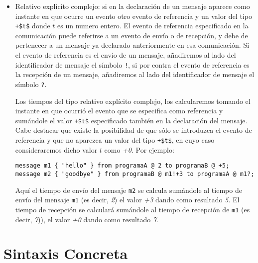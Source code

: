 \begin{itemize}
\item Relativo explicito complejo: si en la declaración de un mensaje
  aparece como instante en que ocurre un evento otro evento de
  referencia y un valor del tipo \lstinline[mathescape]{+$t$} donde
  $t$ es un numero entero. El evento de referencia especificado en la
  comunicación puede referirse a un evento de envío o de recepción, y
  debe de pertenecer a un mensaje ya declarado anteriormente en esa
  comunicación. Si el evento de referencia es el envío de un mensaje,
  añadiremos al lado del identificador de mensaje el símbolo
  \lstinline{!}, si por contra el evento de referencia es la recepción
  de un mensaje, añadiremos al lado del identificador de mensaje el
  símbolo \lstinline{?}.

  Los tiempos del tipo relativo explícito complejo, los calcularemos tomando el
  instante en que ocurrió el evento que se especifica como referencia
  y sumándole el valor \lstinline[mathescape]{+$t$} especificado
  también en la declaración del mensaje. Cabe destacar que existe la
  posibilidad de que sólo se introduzca el evento de referencia y que
  no aparezca un valor del tipo \lstinline[mathescape]{+$t$}, en cuyo
  caso consideraremos dicho valor $t$ como \textit{+0}. Por ejemplo:

  \begin{lstlisting}
message m1 { "hello" } from programaA @ 2 to programaB @ +5;
message m2 { "goodbye" } from programaB @ m1!+3 to programaA @ m1?;
  \end{lstlisting}

  Aquí el tiempo de envío del mensaje \lstinline{m2} se calcula sumándole al tiempo de envío del
  mensaje \lstinline{m1} (es decir, \textit{2}) el valor \textit{+3}
  dando como resultado \textit{5}. El tiempo de recepción se calculará
  sumándole al tiempo de recepción de \lstinline{m1} (es decir,
  \textit{7})), el valor \textit{+0} dando como resultado \textit{7}.
\end{itemize}


\section{Sintaxis Concreta}

